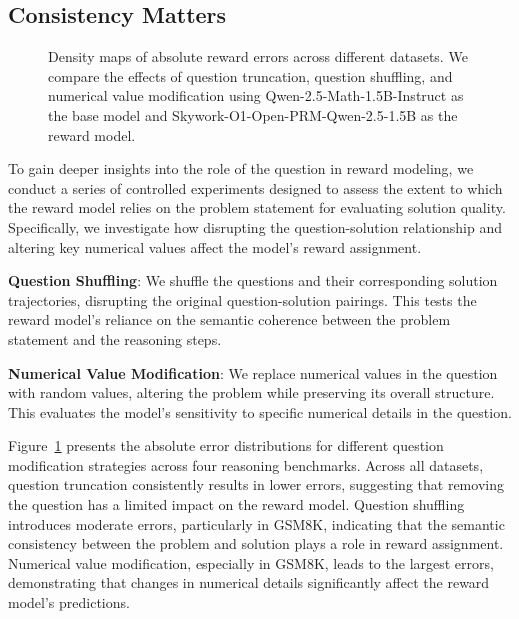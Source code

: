 \documentclass{article}
\begin{document}
\subsection{Consistency Matters}
\begin{figure}[t]
    \centering
    
    
    \caption{Density maps of absolute reward errors across different datasets. We compare the effects of question truncation, question shuffling, and numerical value modification using Qwen-2.5-Math-1.5B-Instruct as the base model and Skywork-O1-Open-PRM-Qwen-2.5-1.5B as the reward model.}
    \label{fig:number}
\end{figure}
To gain deeper insights into the role of the question in reward modeling, we conduct a series of controlled experiments designed to assess the extent to which the reward model relies on the problem statement for evaluating solution quality. Specifically, we investigate how disrupting the question-solution relationship and altering key numerical values affect the model’s reward assignment.

\textbf{Question Shuffling}: We shuffle the questions and their corresponding solution trajectories, disrupting the original question-solution pairings. This tests the reward model’s reliance on the semantic coherence between the problem statement and the reasoning steps.

\textbf{Numerical Value Modification}: We replace numerical values in the question with random values, altering the problem while preserving its overall structure. This evaluates the model’s sensitivity to specific numerical details in the question.

Figure~\ref{fig:number} presents the absolute error distributions for different question modification strategies across four reasoning benchmarks. Across all datasets, question truncation consistently results in lower errors, suggesting that removing the question has a limited impact on the reward model. Question shuffling introduces moderate errors, particularly in GSM8K, indicating that the semantic consistency between the problem and solution plays a role in reward assignment. Numerical value modification, especially in GSM8K, leads to the largest errors, demonstrating that changes in numerical details significantly affect the reward model’s predictions.
\end{document}
